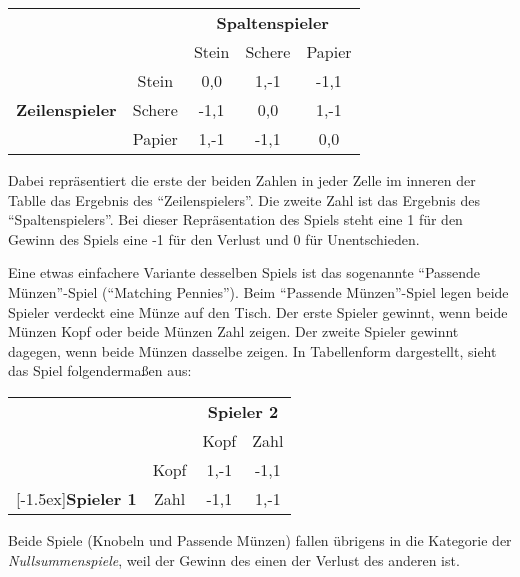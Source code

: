 \begin{center}
\begin{tabular}{cc|c|c|c|}
& \multicolumn{1}{c}{} & \multicolumn{3}{c}{{\bf Spaltenspieler}} \\
& \multicolumn{1}{c}{} & \multicolumn{1}{c}{Stein} 
& \multicolumn{1}{c}{Schere} &  \multicolumn{1}{c}{Papier}  \\
\cline{3-5} 
& Stein              & 0,0     & 1,-1   &  -1,1 \\
\cline{3-5} {\bf Zeilenspieler}  
& Schere             & -1,1    & 0,0    & 1,-1 \\ \cline{3-5}
& Papier             & 1,-1    & -1,1   & 0,0 \\ \cline{3-5}
\end{tabular}
\end{center}

Dabei repräsentiert die erste der beiden Zahlen in jeder Zelle im inneren der
Tablle das Ergebnis des "`Zeilenspielers"'. Die zweite Zahl ist das Ergebnis des
"`Spaltenspielers"'. Bei dieser Repräsentation des Spiels steht eine 1 für den
Gewinn des Spiels eine -1 für den Verlust und 0 für Unentschieden.

Eine etwas einfachere Variante desselben Spiels ist das sogenannte
"`Passende Münzen"'-Spiel ("`Matching Pennies"'). Beim "`Passende Münzen"'-Spiel
legen beide Spieler verdeckt eine Münze auf den Tisch. Der erste Spieler gewinnt,
wenn beide Münzen Kopf oder beide Münzen Zahl zeigen. 
Der zweite Spieler gewinnt dagegen, wenn
beide Münzen dasselbe zeigen. In Tabellenform dargestellt, sieht das Spiel
folgendermaßen aus:

\begin{center}
\begin{tabular}{cc|c|c|}
& \multicolumn{1}{c}{} & \multicolumn{2}{c}{\bf Spieler 2} \\
& \multicolumn{1}{c}{} & \multicolumn{1}{c}{Kopf} & \multicolumn{1}{c}{Zahl}
\\ \cline{3-4} 
& Kopf                 & 1,-1                      & -1,1  \\ \cline{3-4}
\raisebox{1.5ex}[-1.5ex]{{\bf Spieler 1}} 
& Zahl                 & -1,1                      & 1,-1 \\ \cline{3-4}
\end{tabular}
\end{center}

Beide Spiele (Knobeln und Passende Münzen) fallen übrigens in die Kategorie der
{\em Nullsummenspiele}, weil der Gewinn des einen der Verlust des anderen ist.

